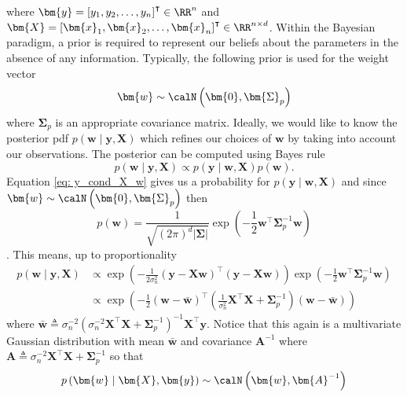 where $\bm{y} = \left[ y_1 , y_2 , \ldots , y_n \right]^{\intercal} \in \RR^n$ and $\bm{X} = \left[ \bm{x}_1 , \bm{x}_2 , \ldots , \bm{x}_n \right]^{\intercal} \in \RR^{n \times d}$. Within the Bayesian paradigm, a prior is required to represent our beliefs about the parameters in the absence of any information. Typically, the following prior is used for the weight vector
\[
    \bm{w} \sim \calN \left( \bm{0}, \bm{\Sigma}_p \right)
\]
where $\bm{\Sigma}_p$ is an appropriate covariance matrix. Ideally, we would like to know the posterior pdf $p \left( \bm{w} \mid \bm{y} , \bm{X} \right)$ which refines our choices of $\bm{w}$ by taking into account our observations. The posterior can be computed using Bayes rule
\[
    p \left( \bm{w} \mid \bm{y} , \bm{X} \right) \propto p \left( \bm{y} \mid \bm{w} , \bm{X} \right) p \left( \bm{w} \right).
\]
Equation \ref{eq: y_cond_X_w} gives us a probability for $p \left( \bm{y} \mid \bm{w} , \bm{X} \right)$ and since $\bm{w} \sim \calN \left( \bm{0}, \bm{\Sigma}_p \right)$ then
\begin{equation*}
    p \left( \bm{w} \right) = \frac{1}{\sqrt{\left( 2 \pi \right)^{d} \left| \bm{\Sigma} \right|}} \exp \left( -\frac{1}{2} \bm{w}^{\intercal} \bm{\Sigma}_p^{-1} \bm{w} \right)
\end{equation*}
\cite{KroeseDirkP2014SMaC}. This means, up to proportionality
\begin{align*}
    p \left( \bm{w} \mid \bm{y} , \bm{X} \right)
     & \propto \exp \left( - \frac{1}{2 \sigma_n^2} \left( \bm{y} - \bm{X} \bm{w} \right)^{\intercal} \left( \bm{y} - \bm{X} \bm{w} \right) \right) \exp \left( -\frac{1}{2} \bm{w}^{\intercal} \bm{\Sigma}_p^{-1} \bm{w} \right) \\
     & \propto \exp \left( - \frac{1}{2} \left( \bm{w} - \bar{\bm{w}} \right)^{\intercal} \left( \frac{1}{\sigma^2_n} \bm{X}^{\intercal} \bm{X} + \bm{\Sigma}_p^{-1} \right) \left( \bm{w} - \bar{\bm{w}} \right) \right)
\end{align*}
where $\bar{\bm{w}} \triangleq \sigma_{n}^{-2} \left( \sigma_{n}^{-2} \bm{X}^{\intercal} \bm{X} + \bm{\Sigma}_p^{-1} \right)^{-1} \bm{X}^{\intercal} \bm{y}$. Notice that this again is a multivariate Gaussian distribution with mean $\bar{\bm{w}}$ and covariance $\bm{A}^{-1}$ where $\bm{A} \triangleq \sigma_{n}^{-2} \bm{X}^{\intercal} \bm{X} + \bm{\Sigma}_p^{-1}$ so that
\begin{equation*}
    p \left( \bm{w} \mid \bm{X} , \bm{y} \right) \sim \calN \left( \bm{w} , \bm{A}^{-1} \right)
\end{equation*}
